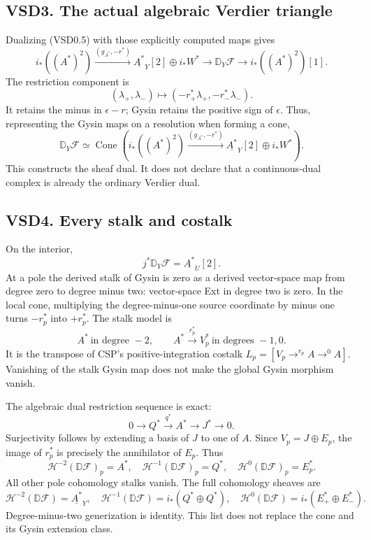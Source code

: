\subsection{VSD3. The actual algebraic Verdier
triangle}\label{vsd3.-the-actual-algebraic-verdier-triangle}

Dualizing (VSD0.5) with those explicitly computed maps gives \[
i_*((A^*)^2)\xrightarrow{(g_{A^*},-r^*)}
\underline{A^*}_Y[2]\oplus i_*W^*
\longrightarrow\mathbb D_Y\mathscr F
\longrightarrow i_*((A^*)^2)[1].
\tag{VSD3.1}
\] The restriction component is \[
(\lambda_+,\lambda_-)\mapsto
(-r_+^*\lambda_+,-r_-^*\lambda_-).
\tag{VSD3.2}
\] It retains the minus in \(\epsilon-r\); Gysin retains the positive
sign of \(\epsilon\). Thus, representing the Gysin maps on a resolution
when forming a cone, \[
\boxed{\mathbb D_Y\mathscr F\simeq
\operatorname{Cone}\left(
i_*((A^*)^2)\xrightarrow{(g_{A^*},-r^*)}
\underline{A^*}_Y[2]\oplus i_*W^*\right).}
\tag{VSD3.3}
\] This constructs the sheaf dual. It does not declare that a
continuous-dual complex is already the ordinary Verdier dual.

\subsection{VSD4. Every stalk and
costalk}\label{vsd4.-every-stalk-and-costalk}

On the interior, \[
j^*\mathbb D_Y\mathscr F=\underline{A^*}_U[2].
\tag{VSD4.1}
\] At a pole the derived stalk of Gysin is zero as a derived
vector-space map from degree zero to degree minus two: vector-space Ext
in degree two is zero. In the local cone, multiplying the
degree-minus-one source coordinate by minus one turns \(-r_p^*\) into
\(+r_p^*\). The stalk model is \[
A^*\ \text{in degree }-2,\qquad
A^*\xrightarrow{r_p^*}V_p^*
\ \text{in degrees }-1,0.
\tag{VSD4.2}
\] It is the transpose of CSP's positive-integration costalk
\(L_p=[V_p\to^{r_p}A\to^0A]\). Vanishing of the stalk Gysin map does not
make the global Gysin morphism vanish.

The algebraic dual restriction sequence is exact: \[
0\to Q^*\xrightarrow{q^*}A^*\to J^*\to0.
\tag{VSD4.3}
\] Surjectivity follows by extending a basis of \(J\) to one of \(A\).
Since \(V_p=J\oplus E_p\), the image of \(r_p^*\) is precisely the
annihilator of \(E_p\). Thus \[
\mathcal H^{-2}(\mathbb D\mathscr F)_p=A^*,\quad
\mathcal H^{-1}(\mathbb D\mathscr F)_p=Q^*,\quad
\mathcal H^0(\mathbb D\mathscr F)_p=E_p^*.
\tag{VSD4.4}
\] All other pole cohomology stalks vanish. The full cohomology sheaves
are \[
\mathcal H^{-2}(\mathbb D\mathscr F)=\underline{A^*}_Y,\quad
\mathcal H^{-1}(\mathbb D\mathscr F)=i_*(Q^*\oplus Q^*),\quad
\mathcal H^0(\mathbb D\mathscr F)=i_*(E_+^*\oplus E_-^*).
\tag{VSD4.5}
\] Degree-minus-two generization is identity. This list does not replace
the cone and its Gysin extension class.

